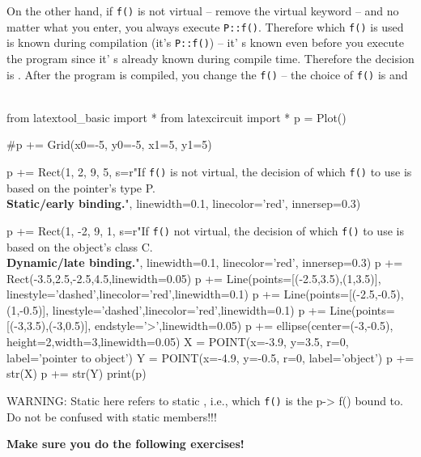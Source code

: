 On the other hand, if \verb!f()! is not virtual -- remove the virtual keyword -- and no matter what you enter, you always execute \verb!P::f()!. Therefore which \verb!f()! is used is known during compilation (it's \verb!P::f()!) -- it' s known even before you execute the program since it' s already known during compile time. Therefore the decision is . After the program is compiled, you  change the \verb!f()! -- the choice of \verb!f()! is  and 
\newpage
{}\\
\\
\begin{python}
from latextool_basic import *
from latexcircuit import *
p = Plot()

#p += Grid(x0=-5, y0=-5, x1=5, y1=5)

p += Rect(1, 2, 9, 5, s=r"If \texttt{f()} is not virtual, the decision of which \texttt{f()} to use is based on the pointer's type P.\\ \textbf{Static/early binding.}", linewidth=0.1, linecolor='red', innersep=0.3)

p += Rect(1, -2, 9, 1, s=r"If \texttt{f()} not virtual, the decision of which \texttt{f()} to use is based on the object's class C.\\ \textbf{Dynamic/late binding.}", linewidth=0.1, linecolor='red', innersep=0.3)
p += Rect(-3.5,2.5,-2.5,4.5,linewidth=0.05)
p += Line(points=[(-2.5,3.5),(1,3.5)], linestyle='dashed',linecolor='red',linewidth=0.1)
p += Line(points=[(-2.5,-0.5),(1,-0.5)], linestyle='dashed',linecolor='red',linewidth=0.1)
p += Line(points=[(-3,3.5),(-3,0.5)], endstyle='>',linewidth=0.05)
p += ellipse(center=(-3,-0.5), height=2,width=3,linewidth=0.05)
X = POINT(x=-3.9, y=3.5, r=0, label='pointer to object')
Y = POINT(x=-4.9, y=-0.5, r=0, label='object')
p += str(X)
p += str(Y)
print(p)
\end{python}
WARNING: Static here refers to static , i.e., which \verb!f()! is the p-> f() bound to. Do not be confused with static members!!!

\textbf{Make sure you do the following exercises!}

